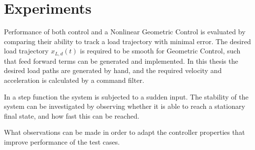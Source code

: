 
\section{Experiments}\label{sec:set.exp}
Performance of both  control and a Nonlinear Geometric Control is evaluated by comparing their ability to track a load trajectory with minimal error. 
The desired load trajectory $ x_{L,d}(t) $ is required to be smooth for Geometric Control, such that feed forward terms can be generated and implemented. 
In this thesis the desired load paths are generated by hand, and the required velocity and acceleration is calculated by a command filter. 

In a step function the system is subjected to a sudden input. The stability of the system can be investigated by observing whether it is able to reach a stationary final state, and how fast this can be reached. 

What observations can be made in order to adapt the controller properties that improve performance of the test cases.



